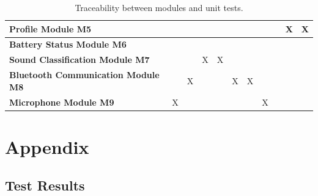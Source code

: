 \documentclass[12pt, titlepage]{article}
\begin{document}
\begin{table}[H]
\begin{tabular}{|p{2.5cm}|llllllllll|}
  \textbf{Profile Module M5}                 & \multicolumn{1}{l|}{}            & \multicolumn{1}{l|}{}            & \multicolumn{1}{l|}{}            & \multicolumn{1}{l|}{}            & \multicolumn{1}{l|}{}            & \multicolumn{1}{l|}{}            & \multicolumn{1}{l|}{}             & \multicolumn{1}{l|}{}             & \multicolumn{1}{l|}{X}            & X            \\ \hline
  \textbf{Battery Status Module M6}          & \multicolumn{1}{l|}{}            & \multicolumn{1}{l|}{}            & \multicolumn{1}{l|}{}            & \multicolumn{1}{l|}{}            & \multicolumn{1}{l|}{}            & \multicolumn{1}{l|}{}            & \multicolumn{1}{l|}{}             & \multicolumn{1}{l|}{}             & \multicolumn{1}{l|}{}             &              \\ \hline
  \textbf{Sound Classification Module M7}    & \multicolumn{1}{l|}{}            & \multicolumn{1}{l|}{}            & \multicolumn{1}{l|}{X}           & \multicolumn{1}{l|}{X}           & \multicolumn{1}{l|}{}            & \multicolumn{1}{l|}{}            & \multicolumn{1}{l|}{}             & \multicolumn{1}{l|}{}             & \multicolumn{1}{l|}{}             &              \\ \hline
  \textbf{Bluetooth Communication Module M8} & \multicolumn{1}{l|}{}            & \multicolumn{1}{l|}{X}           & \multicolumn{1}{l|}{}            & \multicolumn{1}{l|}{}            & \multicolumn{1}{l|}{X}           & \multicolumn{1}{l|}{X}           & \multicolumn{1}{l|}{}             & \multicolumn{1}{l|}{}             & \multicolumn{1}{l|}{}             &              \\ \hline
  \textbf{Microphone Module M9}              & \multicolumn{1}{l|}{X}           & \multicolumn{1}{l|}{}            & \multicolumn{1}{l|}{}            & \multicolumn{1}{l|}{}            & \multicolumn{1}{l|}{}            & \multicolumn{1}{l|}{}            & \multicolumn{1}{l|}{X}            & \multicolumn{1}{l|}{}             & \multicolumn{1}{l|}{}             &              \\ \hline
  \end{tabular}
  \caption{Traceability between modules and unit tests.}
  \label{tab:my-table}
\end{table}

\newpage{}
\section{Appendix}
\subsection{Test Results}
\end{document}
